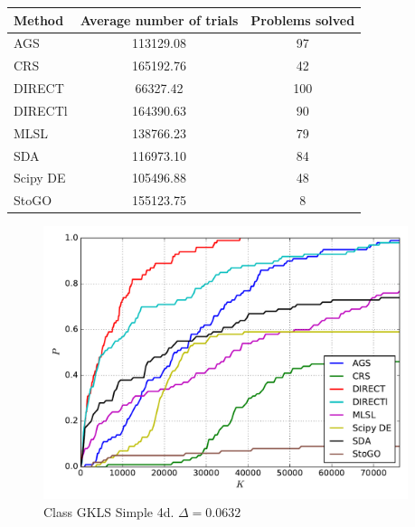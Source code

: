 \documentclass[a4paper]{article}
\begin{document}
\begin{tabular}{lcc}
\hline
 Method   &  Average number of trials  &  Problems solved  \\
\hline
 AGS      &         113129.08          &        97         \\
 CRS      &         165192.76          &        42         \\
 DIRECT   &          66327.42          &        100        \\
 DIRECTl  &         164390.63          &        90         \\
 MLSL     &         138766.23          &        79         \\
 SDA      &         116973.10          &        84         \\
 Scipy DE &         105496.88          &        48         \\
 StoGO    &         155123.75          &         8         \\
\hline
\end{tabular}
\begin{figure}[H]
  \center
  \includegraphics[width=0.95\textwidth]{../experiments/gklss4d/cmc.pdf}
  \caption{Class GKLS Simple 4d. $\Delta=0.0632$}
\end{figure}
\end{document}
